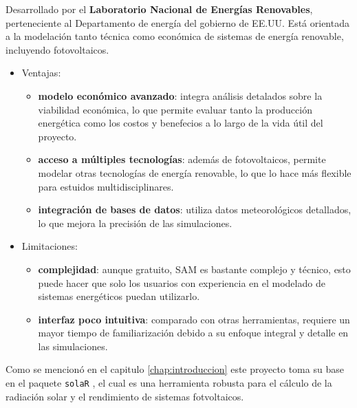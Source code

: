 \begin{enumerate}
Desarrollado por el \textbf{Laboratorio Nacional de Energías Renovables}, perteneciente al Departamento de energía del gobierno de EE.UU. Está orientada a la modelación tanto técnica como económica de sistemas de energía renovable, incluyendo fotovoltaicos.
\begin{itemize}
\item Ventajas:
\begin{itemize}
\item \textbf{modelo económico avanzado}: integra análisis detalados sobre la viabilidad económica, lo que permite evaluar tanto la producción energética como los costos y benefecios a lo largo de la vida útil del proyecto.
\item \textbf{acceso a múltiples tecnologías}: además de fotovoltaicos, permite modelar otras tecnologías de energía renovable, lo que lo hace más flexible para estuidos multidisciplinares.
\item \textbf{integración de bases de datos}: utiliza datos meteorológicos detallados, lo que mejora la precisión de las simulaciones.
\end{itemize}
\item Limitaciones:
\begin{itemize}
\item \textbf{complejidad}: aunque gratuito, SAM es bastante complejo y técnico, esto puede hacer que solo los usuarios con experiencia en el modelado de sistemas energéticos puedan utilizarlo.
\item \textbf{interfaz poco intuitiva}: comparado con otras herramientas, requiere un mayor tiempo de familiarización debido a su enfoque integral y detalle en las simulaciones.
\end{itemize}
\end{itemize}
\end{enumerate}

Como se mencionó en el capitulo \ref{chap:introduccion} este proyecto toma su base en el paquete \texttt{solaR} \cite{perpinan12}, el cual es una herramienta robusta para el cálculo de la radiación solar y el rendimiento de sistemas fotvoltaicos.

